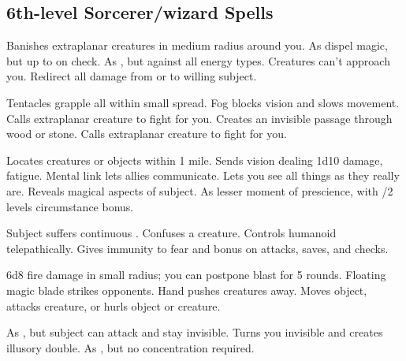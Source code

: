 \subsection{6th-level Sorcerer/wizard Spells} 
\begin{swspelllist}
   Banishes extraplanar creatures in medium radius around you.
   As dispel magic, but up to  on check.
   As , but against all energy types.
   Creatures can't approach you.
   Redirect all damage from or to willing subject.

   Tentacles grapple all within small spread.
   Fog blocks vision and slows movement.
   Calls extraplanar creature to fight for you.
   Creates an invisible passage through wood or stone.
   Calls extraplanar creature to fight for you.

   Locates creatures or objects within 1 mile.
   Sends vision dealing 1d10 damage, fatigue.
   Mental link lets allies communicate.
  \M Lets you see all things as they really are.
  \F Reveals magical aspects of subject.
   As lesser moment of prescience, with /2 levels circumstance bonus.

   Subject suffers continuous .
   Confuses a creature.
   Controls humanoid telepathically.
   Gives immunity to fear and bonus on attacks, saves, and checks.

   6d8 fire damage in small radius; you can postpone blast for 5 rounds.
  \F Floating magic blade strikes opponents.
   Hand pushes creatures away.
   Moves object, attacks creature, or hurls object or creature.

   As , but subject can attack and stay invisible.
   Turns you invisible and creates illusory double.
   As , but no concentration required.
  \spellheadrestricted{}


\end{swspelllist}

